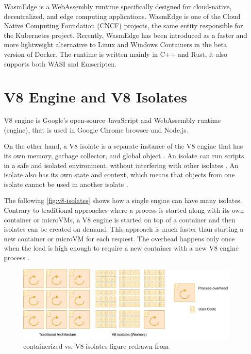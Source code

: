 WasmEdge \cite{he_2023_wasmedge} is a WebAssembly runtime specifically designed for cloud-native, decentralized, and \gls{edge computing} applications. WasmEdge is one of the Cloud Native Computing Foundation (CNCF) \cite{cloudnativecomputingfoundation_2023_cloud} projects, the same entity responsible for the Kubernetes project. Recently, WasmEdge has been introduced as a faster and more lightweight alternative to Linux and Windows Containers in the beta version of Docker. The runtime is written mainly in C++ and Rust, it also supports both WASI and Emscripten. 

\section{V8 Engine and V8 Isolates}
\label{sec:v8-comparison}

\gls{V8} engine is Google's open-source JavaScript and WebAssembly runtime (engine), that is used in Google Chrome browser and Node.js.

On the other hand, a V8 isolate is a separate instance of the V8 engine that has its own memory, garbage collector, and global object \cite{a2021_isolate}. An isolate can run scripts in a safe and isolated environment, without interfering with other isolates \cite{cloudflareinc_2023_how}. An isolate also has its own state and context, which means that objects from one isolate cannot be used in another isolate \cite{a2021_isolate}.

The following \autoref{fig:v8-isolates} shows how a single engine can have many isolates. Contrary to traditional approaches where a process is started along with its own container or microVMs, a \gls{V8} engine is started on top of a container and then isolates can be created on demand. This approach is much faster than starting a new container or microVM for each request. The overhead happens only once when the load is high enough to require a new container with a new V8 engine process \cite{cloudflareinc_2023_how}.

\begin{figure}[H]
	\centering
		\includegraphics[width=\textwidth,height=\textheight,keepaspectratio]{images/runtimes/v8-isolates.pdf}
	\caption{containerized vs. \gls{V8} \glspl{isolate} figure redrawn from \cite{cloudflareinc_2023_how}}
	\label{fig:v8-isolates}
\end{figure}


